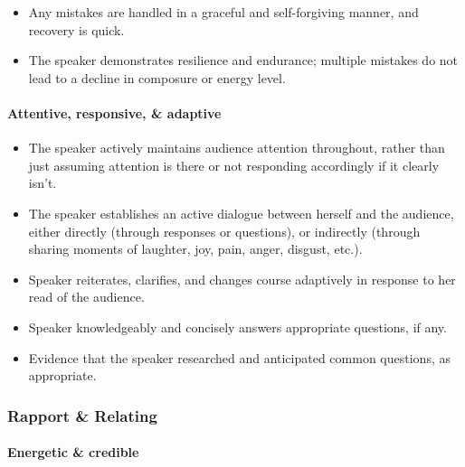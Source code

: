 \documentclass[
]{book}
\providecommand{\tightlist}{%
  \setlength{\itemsep}{0pt}\setlength{\parskip}{0pt}}
\begin{document}
\begin{itemize}
\tightlist
\item
  Any mistakes are handled in a graceful and self-forgiving manner, and recovery is quick.\\
\item
  The speaker demonstrates resilience and endurance; multiple mistakes do not lead to a decline
  in composure or energy level.
\end{itemize}

\hypertarget{attentive-responsive-adaptive}{%
\paragraph{Attentive, responsive, \& adaptive}\label{attentive-responsive-adaptive}}

\begin{itemize}
\tightlist
\item
  The speaker actively maintains audience attention throughout, rather than just assuming
  attention is there or not responding accordingly if it clearly isn't.\\
\item
  The speaker establishes an active dialogue between herself and the audience, either directly
  (through responses or questions), or indirectly (through sharing moments of laughter, joy, pain,
  anger, disgust, etc.).\\
\item
  Speaker reiterates, clarifies, and changes course adaptively in response to her read of the
  audience.\\
\item
  Speaker knowledgeably and concisely answers appropriate questions, if any.\\
\item
  Evidence that the speaker researched and anticipated common questions, as appropriate.
\end{itemize}

\hypertarget{rapport-relating}{%
\subsubsection*{Rapport \& Relating}\label{rapport-relating}}

\hypertarget{energetic-credible}{%
\paragraph{Energetic \& credible}\label{energetic-credible}}
\end{document}
